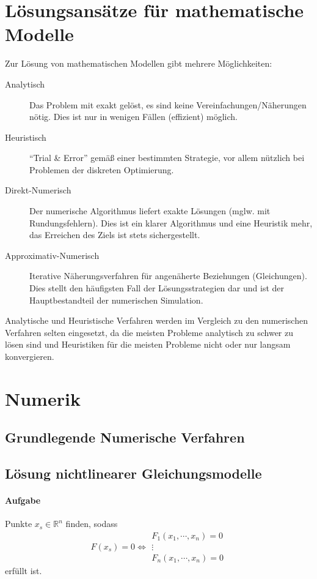 	\section{Lösungsansätze für mathematische Modelle} %
		Zur Lösung von mathematischen Modellen gibt mehrere Möglichkeiten:
		\begin{description}
			\item[Analytisch] Das Problem mit exakt gelöst, es sind keine Vereinfachungen/Näherungen nötig. Dies ist nur in wenigen Fällen (effizient) möglich.
			\item[Heuristisch] \enquote{Trial \& Error} gemäß einer bestimmten Strategie, vor allem nützlich bei Problemen der diskreten Optimierung.
			\item[Direkt-Numerisch] Der numerische Algorithmus liefert exakte Lösungen (mglw. mit Rundungsfehlern). Dies ist ein klarer Algorithmus und eine Heuristik mehr, das Erreichen des Ziels ist stets sichergestellt.
			\item[Approximativ-Numerisch] Iterative Näherungsverfahren für angenäherte Beziehungen (Gleichungen). Dies stellt den häufigsten Fall der Lösungsstrategien dar und ist der Hauptbestandteil der numerischen Simulation.
		\end{description}

		Analytische und Heuristische Verfahren werden im Vergleich zu den numerischen Verfahren selten eingesetzt, da die meisten Probleme analytisch zu schwer zu lösen sind und Heuristiken für die meisten Probleme nicht oder nur langsam konvergieren.

	\section{Numerik} %
		\subsection{Grundlegende Numerische Verfahren}


		\subsection{Lösung nichtlinearer Gleichungsmodelle} %
			\paragraph{Aufgabe}
				Punkte \( x _ s \in \mathbb{R} ^ n \) finden, sodass
				\begin{equation*}
					F(x _ s) = 0 \iff
					\begin{matrix}
						F _ 1 (x _ 1, \cdots, x _ n) = 0 \\
						\vdots                           \\
						F _ n (x _ 1, \cdots, x _ n) = 0
					\end{matrix}
				\end{equation*}
				erfüllt ist.

